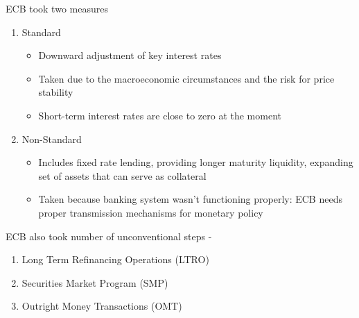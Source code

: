 \documentclass{beamer}
\begin{document}
\begin{frame}
  ECB took two measures
  \begin{enumerate}
    \item Standard
  \begin{itemize}
    \item Downward adjustment of key interest rates
    \item Taken due to the macroeconomic circumstances and the risk for price stability
    \item Short-term interest rates are close to zero at the moment
  \end{itemize}
  \medskip
  \item Non-Standard
  \begin{itemize}
    \item Includes fixed rate lending, providing longer maturity liquidity, expanding set of assets that can serve as collateral
    \item Taken because banking system wasn't functioning properly: ECB needs proper transmission mechanisms for monetary policy    
  \end{itemize}
  \end{enumerate}
\end{frame}


\begin{frame}
  ECB also took number of unconventional steps -
  \begin{enumerate}
    \item Long Term Refinancing Operations (LTRO)
    \item Securities Market Program (SMP)
    \item Outright Money Transactions (OMT) 
  \end{enumerate}
\end{frame}
\end{document}
